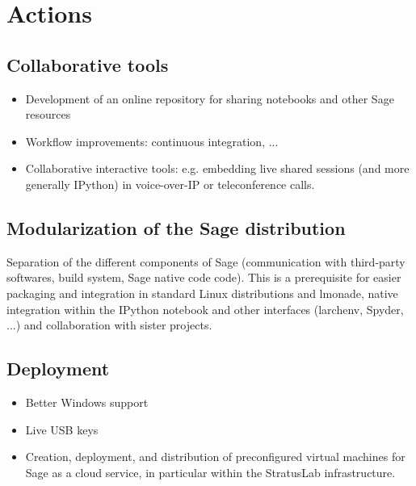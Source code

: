 \section{Actions}



\subsection{Collaborative tools}

\begin{itemize}
\item Development of an online repository for sharing notebooks and
  other Sage resources
\item Workflow improvements: continuous integration, ...
\item Collaborative interactive tools: e.g.  embedding live shared
  \sage sessions (and more generally IPython) in voice-over-IP or
  teleconference calls.
\end{itemize}


\subsection{Modularization of the Sage distribution}
Separation of the different components of Sage (communication with third-party softwares, build system, Sage native code code). This is a prerequisite for easier packaging and integration in standard Linux distributions and lmonade, native integration within the IPython notebook and other interfaces (larchenv, Spyder, ...) and collaboration with sister projects.

\subsection{Deployment}
\begin{itemize}
\item Better Windows support
\item Live USB keys
\item Creation, deployment, and distribution of preconfigured virtual
machines for Sage as a cloud service, in particular within the
StratusLab infrastructure.
\end{itemize}

